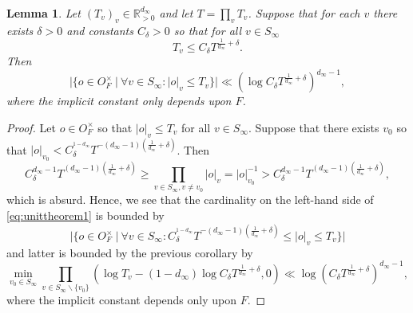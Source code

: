 \documentclass[a4paper,11pt]{amsart}
\newtheorem{lemma}[theorem]{Lemma}
\theoremstyle{definition}
\newcommand{\R}{\mathbb{R}}
\begin{document}
\begin{lemma}\label{lem:countingunits}
    Let $(T_v)_v \in \R_{>0}^{d_{\infty}}$ and let $T = \prod_{v}T_v$. Suppose that for each $v$ there exists $\delta >0$ and constants $C_{\delta}>0$ so that for all $v\in S_{\infty}$ \[  T_v\leq C_{\delta}T^{\frac{1}{d_{\infty}}+\delta}.\] Then
    \begin{equation*}\label{eq:unittheorem1}
        \vert{\{o \in O_F^{\times}\ | \  \forall v \in S_{\infty}: \vert{o}\vert_v\leq T_v}\}\vert \ll (\log C_{\delta}T^{\frac{1}{d_{\infty}}+\delta})^{d_{\infty}-1}, \end{equation*} 
    where the implicit constant only depends upon $F$. 
\end{lemma}
\begin{proof} Let $o\in O_F^{\times}$ so that $\vert{o}\vert_v \leq T_v$ for all $v\in S_{\infty}$. Suppose that there exists $v_0$ so that $\vert{o}\vert_{v_0} < C_{\delta}^{^{1-d_{\infty}}}T^{-(d_{\infty}-1)(\frac{1}{d_{\infty}}+\delta)}$. Then 
\[  C_{\delta}^{d_{\infty}-1}T^{(d_{\infty}-1)(\frac{1}{d_{\infty}}+\delta)}\geq \prod_{v\in S_{\infty}, v\neq v_0}\vert{o}\vert_v  = \vert{o}\vert_{v_0}^{-1} > C_{\delta}^{d_{\infty}-1}T^{(d_{\infty}-1)(\frac{1}{d_{\infty}}+\delta)}, \]
which is absurd. Hence, we see that the cardinality on the left-hand side of \eqref{eq:unittheorem1} is bounded by  
\[\vert{\{ o\in O_F^{\times}\ | \  \forall v \in S_{\infty}: C_{\delta}^{^{1-d_{\infty}}}T^{-(d_{\infty}-1)(\frac{1}{d_{\infty}}+\delta)}\leq \vert{o}\vert_v \leq T_v \}}\vert\]
and latter is bounded by the previous corollary by
\[\min_{v_0\in S_{\infty}}\prod_{v\in S_{\infty}\smallsetminus\{v_0\}}(\log T_v-(1-d_{\infty})\log C_{\delta}T^{\frac{1}{d_{\infty}}+\delta},0)\ll \log (C_{\delta}T^{\frac{1}{d_{\infty}}+\delta})^{d_{\infty}-1}, \]
where the implicit constant depends only upon $F$.
\end{proof}
\end{document}
